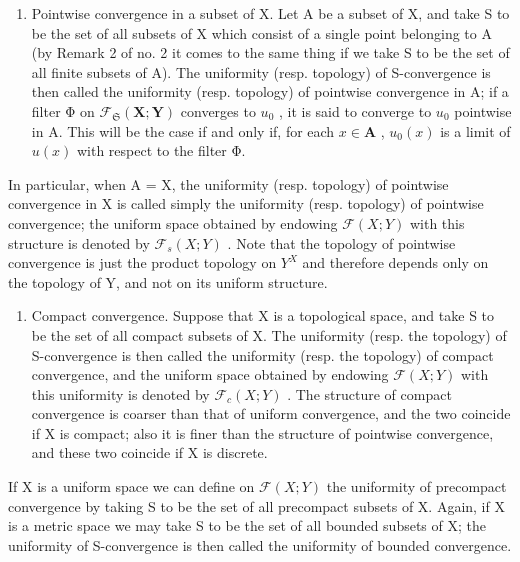 \begin{enumerate}
\def\labelenumi{\Roman{enumi}.}
\setcounter{enumi}{1}
\tightlist
\item
  Pointwise convergence in a subset of X. Let A be a subset of X, and take S to be the set of all subsets of X which consist of a single point belonging to A (by Remark 2 of no. 2 it comes to the same thing if we take S to be the set of all finite subsets of A). The uniformity (resp. topology) of S-convergence is then called the uniformity (resp. topology) of pointwise convergence in A; if a filter Φ on \(\mathcal{F}_{\mathfrak{S}}(\mathbf{X};\mathbf{Y})\) converges to \(u_0\) , it is said to converge to \(u_0\) pointwise in A. This will be the case if and only if, for each \(x\in \mathbf{A}\) , \(u_0(x)\) is a limit of \(u(x)\) with respect to the filter Φ.
\end{enumerate}

In particular, when A = X, the uniformity (resp. topology) of pointwise convergence in X is called simply the uniformity (resp. topology) of pointwise convergence; the uniform space obtained by endowing \(\mathcal{F}(X; Y)\) with this structure is denoted by \(\mathcal{F}_{s}(X; Y)\) . Note that the topology of pointwise convergence is just the product topology on \(Y^{X}\) and therefore depends only on the topology of Y, and not on its uniform structure.

\begin{enumerate}
\def\labelenumi{\Roman{enumi}.}
\setcounter{enumi}{2}
\tightlist
\item
  Compact convergence. Suppose that X is a topological space, and take S to be the set of all compact subsets of X. The uniformity (resp. the topology) of S-convergence is then called the uniformity (resp. the topology) of compact convergence, and the uniform space obtained by endowing \(\mathcal{F}(X;Y)\) with this uniformity is denoted by \(\mathcal{F}_{c}(X;Y)\) . The structure of compact convergence is coarser than that of uniform convergence, and the two coincide if X is compact; also it is finer than the structure of pointwise convergence, and these two coincide if X is discrete.
\end{enumerate}

If X is a uniform space we can define on \(\mathcal{F}(X;Y)\) the uniformity of precompact convergence by taking S to be the set of all precompact subsets of X. Again, if X is a metric space we may take S to be the set of all bounded subsets of X; the uniformity of S-convergence is then called the uniformity of bounded convergence.

